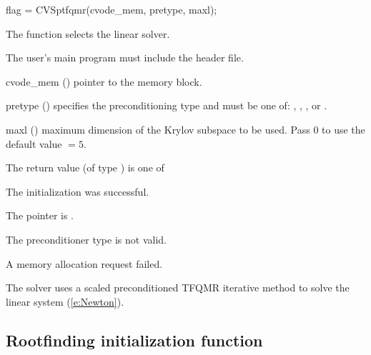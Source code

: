 {
  flag = CVSptfqmr(cvode\_mem, pretype, maxl);
}
{
  The function  selects the {\cvsptfqmr} linear solver. 

  The user's main program must include the  header file.
}
{
  \begin{args}
  \item[cvode\_mem] ()
    pointer to the {\cvode} memory block.
  \item[pretype] ()
    specifies the preconditioning type and must be one of: 
    , , , or .
  \item[maxl] ()
    maximum dimension of the Krylov subspace to be used. Pass $0$ to use the 
    default value  $= 5$.
  \end{args}
}
{
  The return value  (of type ) is one of
  \begin{args}
  \item[\Id{CVSPILS\_SUCCESS}] 
    The {\cvsptfqmr} initialization was successful.
  \item[\Id{CVSPILS\_MEM\_NULL}]
    The  pointer is .
  \item[\Id{CVSPILS\_ILL\_INPUT}]
    The preconditioner type  is not valid.
  \item[\Id{CVSPILS\_MEM\_FAIL}]
    A memory allocation request failed.
  \end{args}
}
{
  The {\cvsptfqmr} solver uses a scaled preconditioned TFQMR
  iterative method to solve the linear system (\ref{e:Newton}).
}



\subsection{Rootfinding initialization function}\label{ss:cvrootinit}

